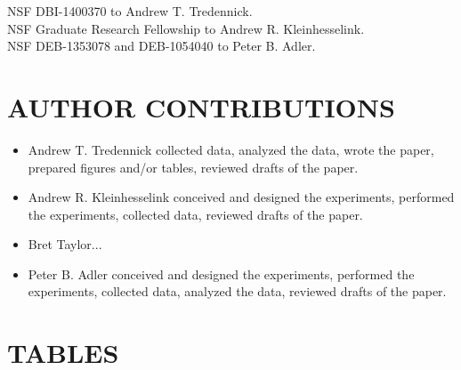 \documentclass[fleqn,10pt,lineno]{wlpeerj} %
\begin{document}
NSF DBI-1400370 to Andrew T. Tredennick.\\
NSF Graduate Research Fellowship to Andrew R. Kleinhesselink.\\
NSF DEB-1353078 and DEB-1054040 to Peter B. Adler.

\section{AUTHOR CONTRIBUTIONS}\label{author-contributions}

\begin{itemize}
  \item Andrew T. Tredennick collected data, analyzed the data, wrote the paper, prepared figures and/or tables, reviewed
drafts of the paper.
  \item Andrew R. Kleinhesselink conceived and designed the experiments, performed the experiments, collected data, reviewed drafts of the paper.
  \item Bret Taylor...
  \item Peter B. Adler conceived and designed the experiments, performed the experiments, collected data, analyzed the data, reviewed
drafts of the paper.
\end{itemize}

\newpage{}

\section{TABLES}\label{tables}
\end{document}
